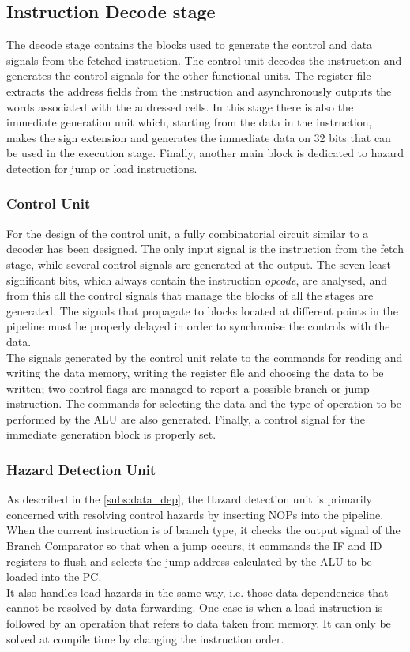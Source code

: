 \subsection{Instruction Decode stage}
The decode stage contains the blocks used to generate the control and data signals from the fetched instruction. The control unit decodes the instruction and generates the control signals for the other functional units. The register file extracts the address fields from the instruction and asynchronously outputs the words associated with the addressed cells. In this stage there is also the immediate generation unit which, starting from the data in the instruction, makes the sign extension and generates the immediate data on 32 bits that can be used in the execution stage. Finally, another main block is dedicated to hazard detection for jump or load instructions.

\subsubsection{Control Unit}
For the design of the control unit, a fully combinatorial circuit similar to a decoder has been designed. The only input signal is the instruction from the fetch stage, while several control signals are generated at the output. The seven least significant bits, which always contain the instruction \textit{opcode}, are analysed, and from this all the control signals that manage the blocks of all the stages are generated. The signals that propagate to blocks located at different points in the pipeline must be properly delayed in order to synchronise the controls with the data.\\
The signals generated by the control unit relate to the commands for reading and writing the data memory, writing the register file and choosing the data to be written; two control flags are managed to report a possible branch or jump instruction. The commands for selecting the data and the type of operation to be performed by the ALU are also generated. Finally, a control signal for the immediate generation block is properly set.


\subsubsection{Hazard Detection Unit}
As described in the \autoref{subs:data_dep}, the Hazard detection unit is primarily concerned with resolving control hazards by inserting NOPs into the pipeline.
When the current instruction is of branch type, it checks the output signal of the Branch Comparator so that when a jump occurs, it commands the IF and ID registers to flush and selects the jump address calculated by the ALU to be loaded into the PC.\\
It also handles load hazards in the same way, i.e. those data dependencies that cannot be resolved by data forwarding. One case is when a load instruction is followed by an operation that refers to data taken from memory. It can only be solved at compile time by changing the instruction order.

